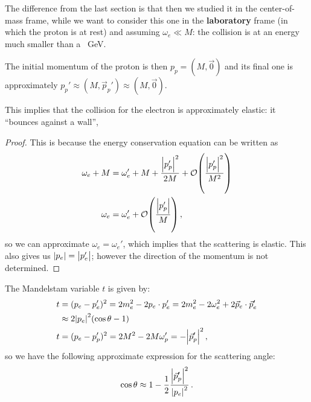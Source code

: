 \documentclass[main.tex]{subfiles}
\begin{document}
The difference from the last section is that then we studied it in the center-of-mass frame, while we want to consider this one in the \textbf{laboratory} frame (in which the proton is at rest) and assuming \(\omega_{e} \ll M\): the collision is at an energy much smaller than a \SI{}{GeV}.

\begin{claim}
The initial momentum of the proton is then \(p_p = (M, \vec{0})\) and its final one is approximately \(p_p' \approx (M, \vec{p}_p') \approx (M, \vec{0})\).
\end{claim}



This implies that the collision for the electron is approximately elastic: it ``bounces against a wall'', 

\begin{proof}
This is because the energy conservation equation can be written as 
%
\begin{align}
\omega_{e} + M &= \omega'_e  +M + \frac{\abs{p_p'}^2}{2M}  + \order{\frac{\abs{p_p'}^2}{M^2}} \\
\omega_{e} &= \omega'_e + \order{\frac{\abs{p_p'}}{M}}
\,,
\end{align}
%
so we can approximate \(\omega_{e} = \omega_{e}'\), which implies that the scattering is elastic. This also gives us \(\abs{p_e} = \abs{p_e'}\); however the direction of the momentum is not determined. 
\end{proof}

The Mandelstam variable \(t\) is given by: 
%
\begin{align}
t &= (p_e - p_e')^2 = 2 m_e^2 - 2 p_e \cdot p_e' = 2 m_e^2 - 2 \omega_{e}^2 + 2 \vec{p}_e \cdot \vec{p}_e ' \\
&\approx 2 \abs{p_e}^2 \qty(\cos \theta - 1)  \\
t &= (p_e - p_p')^2 = 2 M^2 - 2 M \omega_{p}' = - \abs{\vec{p}_p'}^2
\,,
\end{align}
%
so we have the following approximate expression for the scattering angle: 
%
\begin{align}
\cos \theta \approx 1 - \frac{1}{2} \frac{\abs{\vec{p}_p'}^2}{\abs{p_e}^2}
\,.
\end{align}
\end{document}
